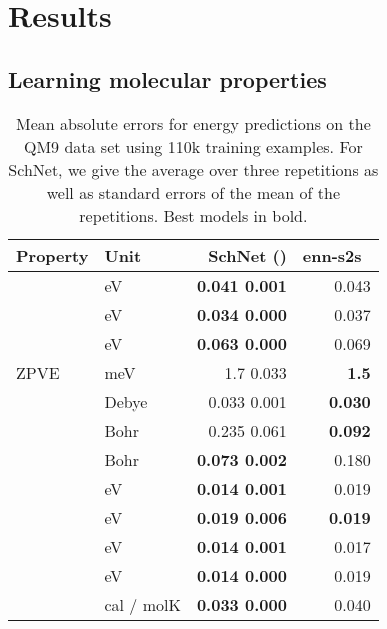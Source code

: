 \documentclass[aip,jcp,reprint,graphicx]{revtex4-1}
\newcommand{\new}[1]{#1}
\begin{document}
\section{Results}
\label{sec:results}



\subsection{Learning molecular properties}


\begin{table}
\caption{\label{tab:qm9} Mean absolute errors for energy predictions on the QM9 data set using 110k training examples. For SchNet, we give the average over three repetitions as well as standard errors \new{of the mean of the repetitions}. Best models in bold.}
\begin{ruledtabular}
\begin{tabular}{llrr}
	Property               & Unit     &                      SchNet () & enn-s2s~\citep{gilmer2017neural} \\ \hline
	 & eV       &  \textbf{0.041  0.001} &                            0.043 \\
	 & eV       &  \textbf{0.034  0.000} &                            0.037 \\
	       & eV       &  \textbf{0.063  0.000} &                            0.069 \\
    ZPVE                   & meV      &             1.7  0.033 &                     \textbf{1.5} \\
	                  & Debye    &           0.033  0.001 &                   \textbf{0.030} \\
	               & Bohr &           0.235  0.061 &                   \textbf{0.092} \\
	  & Bohr &  \textbf{0.073  0.002} &                            0.180 \\
	                  & eV       &  \textbf{0.014  0.001} &                            0.019 \\
	                    & eV       &  \textbf{0.019  0.006} &                   \textbf{0.019} \\
	                    & eV       &  \textbf{0.014  0.001} &                            0.017 \\
	                    & eV       &  \textbf{0.014  0.000} &                            0.019 \\
	                  & cal / molK & \textbf{0.033  0.000} &                             0.040
\end{tabular}
\end{ruledtabular}
\end{table}
\end{document}
